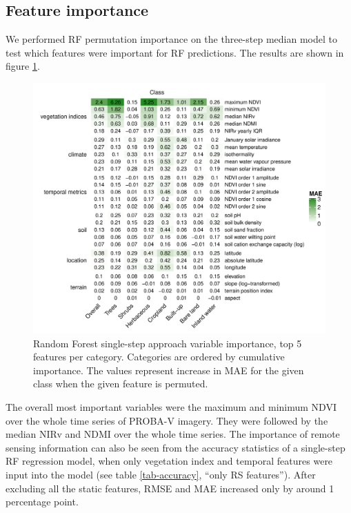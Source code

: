 \documentclass[review,authoryear,3p]{elsarticle}
\begin{document}
\subsection{Feature importance}

We performed \Gls{RF} permutation importance on the three-step median model to test which features were important for \gls{RF} predictions.
The results are shown in figure \ref{fig-varimp}.

\begin{figure}
    \centering
    \includegraphics[width=14cm]{article-figures/heatmaps/2020-11-06-varimp-heatmap-top5}
    \caption{Random Forest single-step approach variable importance, top 5 features per category. Categories are ordered by cumulative importance. The values represent increase in MAE for the given class when the given feature is permuted.}
    \label{fig-varimp}
\end{figure}

The overall most important variables were the maximum and minimum \gls{NDVI} over the whole time series of PROBA-V imagery.
They were followed by the median \gls{NIRv} and \gls{NDMI} over the whole time series.
The importance of remote sensing information can also be seen from the accuracy statistics of a single-step \gls{RF} regression model, when only vegetation index and temporal features were input into the model (see table \ref{tab-accuracy}, ``only RS features'').
After excluding all the static features, \gls{RMSE} and \gls{MAE} increased only by around 1 percentage point.
\end{document}
